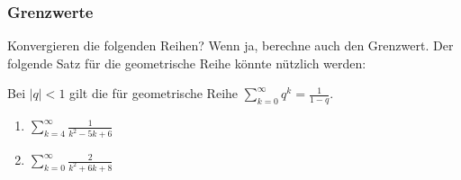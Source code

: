 \documentclass[11pt, a4paper]{article}
\newcommand{\abs}[1]{\left\lvert#1\right\rvert}
\newif\ifshowsolution
\begin{document}
\subsubsection{Grenzwerte}
Konvergieren die folgenden Reihen? Wenn ja, berechne auch den Grenzwert. Der folgende Satz für die geometrische Reihe könnte nützlich werden:

Bei $\abs{q}<1$ gilt die für geometrische Reihe $\sum_{k=0}^\infty q^k = \frac{1}{1-q}$.
\begin{enumerate}
	\item $\sum_{k=4}^\infty \frac{1}{k^2-5k+6}$
	
	\ifshowsolution
		\begin{align*}
			\intertext{Zunächst formen wir die Reihenglieder $a_k$ um}
			a_k &= \frac{1}{k^2-5k+6} \\
			&= \frac{1}{(k-2)(k-3)} \\
			&= \frac{(k-2)-(k-3)}{(k-2)(k-3)} \\
			&= \frac{\cancel{(k-2)}}{\cancel{(k-2)}(k-3)} - \frac{\cancel{(k-3)}}{(k-2)\cancel{(k-3)}} \\
			&= \frac{1}{k-3} - \frac{1}{k-2}		
			\intertext{Dann betrachten wir die Partialsumme $S_n = \sum_{k=4}^n a_k$ (es gilt $\lim_{n \rightarrow \infty} S_n = \sum_{k=0}^\infty a_k$). Das manuelle aufaddieren der Elemente von $S_n$ entlarvt die Reihe als 'Teleskopsumme', bei der sich so gut wie alle Terme rauskürzen lassen:}
			\sum_{k=4}^n a_k = \frac{1}{1} &- \cancel{\frac{1}{2}} \tag{$k=4$} \\
			+ \cancel{\frac{1}{2}} &- \cancel{\frac{1}{3}} \tag{$k=5$} \\
			& \vdots \\
			+ \cancel{\frac{1}{n-4}} &- \cancel{\frac{1}{n-3}} \tag{$k=n-1$} \\
			+ \cancel{\frac{1}{n-3}} &- \frac{1}{n-2} \tag{$k=n$}
		\end{align*}
		Es folgt nun:
		\begin{align*}
			\sum_{k=4}^\infty a_k &= \lim_{n \rightarrow \infty} S_n \\
			&= \lim_{n \rightarrow \infty} 1 - \frac{1}{n-2} \\
			&= 1
		\end{align*}
		Damit konvergierte die Reihe also gegen 1.
	\fi
		
	\item $\sum_{k=0}^\infty \frac{2}{k^2+6k+8}$
	

\end{enumerate}
\end{document}
